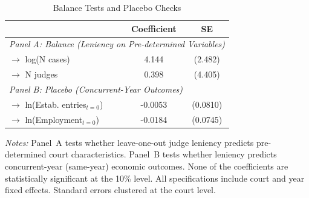 \begin{table}[htbp]
\centering
\caption{Balance Tests and Placebo Checks}
\label{tab:robustness}
\begin{threeparttable}
\begin{tabular}{lcc}
\toprule
 & Coefficient & SE \\
\midrule
\multicolumn{3}{l}{\textit{Panel A: Balance (Leniency on Pre-determined Variables)}} \\[3pt]
$\rightarrow$ log(N cases) & 4.144 & (2.482) \\
$\rightarrow$ N judges & 0.398 & (4.405) \\
\midrule
\multicolumn{3}{l}{\textit{Panel B: Placebo (Concurrent-Year Outcomes)}} \\[3pt]
$\rightarrow$ ln(Estab. entries$_{t=0}$) & -0.0053 & (0.0810) \\
$\rightarrow$ ln(Employment$_{t=0}$) & -0.0184 & (0.0745) \\
\bottomrule
\end{tabular}
\begin{tablenotes}
\small
\item \textit{Notes:} Panel~A tests whether leave-one-out judge leniency predicts pre-determined court characteristics. Panel~B tests whether leniency predicts concurrent-year (same-year) economic outcomes. None of the coefficients are statistically significant at the 10\% level. All specifications include court and year fixed effects. Standard errors clustered at the court level.
\end{tablenotes}
\end{threeparttable}
\end{table}
